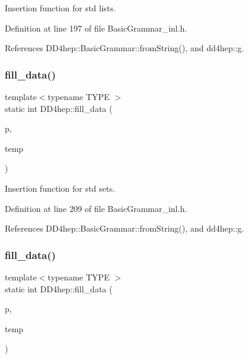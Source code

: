 Insertion function for std lists. 



Definition at line 197 of file Basic\+Grammar\+\_\+inl.\+h.



References D\+D4hep\+::\+Basic\+Grammar\+::from\+String(), and dd4hep\+::g.

\hypertarget{namespace_d_d4hep_a9f2b4b008069b1ed4f751709da449ef3}{}\label{namespace_d_d4hep_a9f2b4b008069b1ed4f751709da449ef3} 
\subsubsection{\texorpdfstring{fill\+\_\+data()}{fill\_data()}\hspace{0.1cm}{\footnotesize\ttfamily [3/5]}}
{\footnotesize\ttfamily template$<$typename T\+Y\+PE $>$ \\
static int D\+D4hep\+::fill\+\_\+data (\begin{DoxyParamCaption}\item[{std\+::set$<$ T\+Y\+PE $>$ $\ast$}]{p,  }\item[{const std\+::vector$<$ std\+::string $>$ \&}]{temp }\end{DoxyParamCaption})\hspace{0.3cm}{\ttfamily [static]}}



Insertion function for std sets. 



Definition at line 209 of file Basic\+Grammar\+\_\+inl.\+h.



References D\+D4hep\+::\+Basic\+Grammar\+::from\+String(), and dd4hep\+::g.

\hypertarget{namespace_d_d4hep_a13ba4d0ea6c67077f0e8d107e8b0e24c}{}\label{namespace_d_d4hep_a13ba4d0ea6c67077f0e8d107e8b0e24c} 
\subsubsection{\texorpdfstring{fill\+\_\+data()}{fill\_data()}\hspace{0.1cm}{\footnotesize\ttfamily [4/5]}}
{\footnotesize\ttfamily template$<$typename T\+Y\+PE $>$ \\
static int D\+D4hep\+::fill\+\_\+data (\begin{DoxyParamCaption}\item[{std\+::deque$<$ T\+Y\+PE $>$ $\ast$}]{p,  }\item[{const std\+::vector$<$ std\+::string $>$ \&}]{temp }\end{DoxyParamCaption})\hspace{0.3cm}{\ttfamily [static]}}



